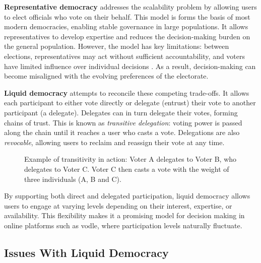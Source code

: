 \textbf{Representative democracy} addresses the scalability problem by allowing users to elect officials who vote on their behalf. This model is forms the basis of most modern democracies, enabling stable governance in large populations. It allows representatives to develop expertise and reduces the decision-making burden on the general population. However, the model has key limitations: between elections, representatives may act without sufficient accountability, and voters have limited influence over individual decisions \citep{blum_liquid_2016}. As a result, decision-making can become misaligned with the evolving preferences of the electorate.

\textbf{Liquid democracy} attempts to reconcile these competing trade-offs. It allows each participant to either vote directly or delegate (entrust) their vote to another participant (a delegate). Delegates can in turn delegate their votes, forming chains of trust. This is known as \textit{transitive delegation}: voting power is passed along the chain until it reaches a user who casts a vote. Delegations are also \textit{revocable}, allowing users to reclaim and reassign their vote at any time.

\begin{figure}[H]
  \centering
  \caption{Example of transitivity in action: Voter A delegates to Voter B, who delegates to Voter C. Voter C then casts a vote with the weight of three individuals (A, B and C).}
  \label{fig:delegation-transitivity}
\end{figure}

By supporting both direct and delegated participation, liquid democracy allows users to engage at varying levels depending on their interest, expertise, or availability. This flexibility makes it a promising model for decision making in online platforms such as vodle, where participation levels naturally fluctuate.

\subsection{Issues With Liquid Democracy}

